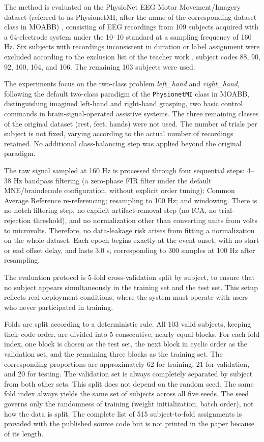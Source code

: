 The method is evaluated on the PhysioNet EEG Motor Movement/Imagery
dataset (referred to as PhysionetMI, after the name of the
corresponding dataset class in MOABB) \cite{schalk2004bci2000,
goldberger2000physiobank}, consisting of EEG recordings from 109
subjects acquired with a 64-electrode system under the 10--10
standard at a sampling frequency of 160 Hz. Six subjects with
recordings inconsistent in duration or label assignment were
excluded according to the exclusion list of the teacher work
\cite{zoumpourlis2024motor}, subject codes 88, 90, 92, 100, 104, and
106. The remaining 103 subjects were used.

The experiments focus on the two-class problem \emph{left\_hand} and
\emph{right\_hand}, following the default two-class paradigm of the
\texttt{PhysionetMI} class in MOABB, distinguishing imagined
left-hand and right-hand grasping, two basic control commands in
brain-signal-operated assistive systems. The three remaining classes
of the original dataset (rest, feet, hands) were not used. The
number of trials per subject is not fixed, varying according to the
actual number of recordings retained. No additional class-balancing
step was applied beyond the original paradigm.

The raw signal sampled at 160 Hz is processed through four
sequential steps: 4--38 Hz bandpass filtering (a zero-phase FIR
filter under the default MNE/braindecode configuration, without
explicit order tuning); Common Average Reference re-referencing;
resampling to 100 Hz; and windowing. There is no notch filtering
step, no explicit artifact-removal step (no ICA, no trial-rejection
threshold), and no normalization other than converting units from
volts to microvolts. Therefore, no data-leakage risk arises from
fitting a normalization on the whole dataset. Each epoch begins
exactly at the event onset, with no start or end offset delay, and
lasts 3.0 s, corresponding to 300 samples at 100 Hz after resampling.

The evaluation protocol is 5-fold cross-validation split by subject,
to ensure that no subject appears simultaneously in the training set
and the test set. This setup reflects real deployment conditions,
where the system must operate with users who never participated in
training.

Folds are split according to a deterministic rule. All 103 valid
subjects, keeping their code order, are divided into 5 consecutive,
nearly equal blocks. For each fold index, one block is chosen as the
test set, the next block in cyclic order as the validation set, and
the remaining three blocks as the training set. The corresponding
proportions are approximately 62 for training, 21 for validation,
and 20 for testing. The validation set is always completely
separated by subject from both other sets. This split does not
depend on the random seed. The same fold index always yields the
same set of subjects across all five seeds. The seed governs only
the randomness of training (weight initialization, batch order), not
how the data is split. The complete list of 515 subject-to-fold
assignments is provided with the published source code but is not
printed in the paper because of its length.

